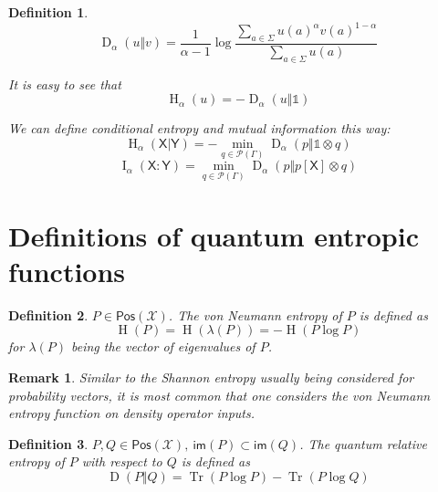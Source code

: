 \documentclass[aps,pra,onecolumn,notitlepage,superscriptaddress]{revtex4-1}
\newcommand{\reg}[1]{\mathsf{#1}}
\newcommand{\spc}[1]{\mathcal{#1}}
\newcommand{\Pos}{\mathsf{Pos}}
\newcommand{\im}{\mathsf{im}}
\newcommand{\Tr}{\operatorname{Tr}}
\newcommand{\op}[1]{\operatorname{#1}}
\newcommand\I{\mathds{1}}
\newtheorem{defi}{Definition}
\newtheorem{rem}{Remark}
\begin{document}
    \begin{defi}
        \begin{equation}
            \op D_\alpha (u \Vert v) = \frac{1}{\alpha-1} \log \frac{\sum_{a \in \Sigma} u(a)^\alpha v(a)^{1-\alpha}}{\sum_{a \in \Sigma} u(a)}
        \end{equation}

        It is easy to see that
        \begin{equation}
            \op H_\alpha(u) = -\op D_\alpha(u \Vert \I)
        \end{equation}

        We can define conditional entropy and mutual information this way:
        \begin{equation}
            \op H_\alpha (\reg X | \reg Y) = - \min_{q \in \spc P(\Gamma)} \op D_\alpha (p \Vert \I \otimes q)
        \end{equation}
        \begin{equation}
            \op I_\alpha (\reg X : \reg Y) = \min_{q \in \spc P(\Gamma)} \op D_\alpha (p \Vert p[\reg X] \otimes q)
        \end{equation}
    \end{defi}

    \section{Definitions of quantum entropic functions}
    \begin{defi}
        $P \in \Pos(\spc X)$. The von Neumann entropy of $P$ is defined as
        \begin{equation}
            \boxed{\op H(P) = \op H(\lambda(P)) = -\op H(P \log P)}
        \end{equation}
        for $\lambda(P)$ being the vector of eigenvalues of $P$.
    \end{defi}

    \begin{rem}
        Similar to the Shannon entropy usually being considered for probability vectors, it is most common that one considers the von Neumann entropy function on density operator inputs.
    \end{rem}

    \begin{defi}
        $P,Q \in \Pos(\spc X), \ \im(P) \subset \im(Q)$. The quantum relative entropy of $P$ with respect to $Q$ is defined as
        \begin{equation}
            \boxed{\op D(P \Vert Q) =  \Tr(P \log P) - \Tr(P \log Q)}
        \end{equation}
    \end{defi}
    
\end{document}
